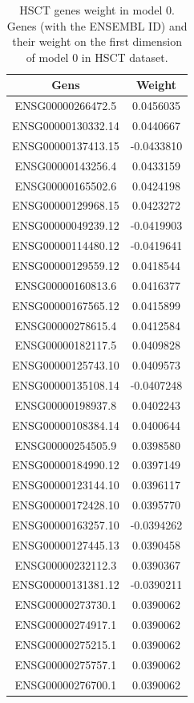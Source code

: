 \documentclass[
  12pt,
  a4paper,
  twoside,
  openright]{book}
\begin{document}
\begin{longtable}[t]{cc}
\caption[HSCT genes weight in model 0]{\label{tab:hsct-genes}HSCT genes weight in model 0. Genes (with the ENSEMBL ID) and their weight on the first dimension of model 0 in HSCT dataset.}\\
\toprule
Gens & Weight\\
\midrule
ENSG00000266472.5 & 0.0456035\\
ENSG00000130332.14 & 0.0440667\\
ENSG00000137413.15 & -0.0433810\\
ENSG00000143256.4 & 0.0433159\\
ENSG00000165502.6 & 0.0424198\\
\addlinespace
ENSG00000129968.15 & 0.0423272\\
ENSG00000049239.12 & -0.0419903\\
ENSG00000114480.12 & -0.0419641\\
ENSG00000129559.12 & 0.0418544\\
ENSG00000160813.6 & 0.0416377\\
\addlinespace
ENSG00000167565.12 & 0.0415899\\
ENSG00000278615.4 & 0.0412584\\
ENSG00000182117.5 & 0.0409828\\
ENSG00000125743.10 & 0.0409573\\
ENSG00000135108.14 & -0.0407248\\
\addlinespace
ENSG00000198937.8 & 0.0402243\\
ENSG00000108384.14 & 0.0400644\\
ENSG00000254505.9 & 0.0398580\\
ENSG00000184990.12 & 0.0397149\\
ENSG00000123144.10 & 0.0396117\\
\addlinespace
ENSG00000172428.10 & 0.0395770\\
ENSG00000163257.10 & -0.0394262\\
ENSG00000127445.13 & 0.0390458\\
ENSG00000232112.3 & 0.0390367\\
ENSG00000131381.12 & -0.0390211\\
\addlinespace
ENSG00000273730.1 & 0.0390062\\
ENSG00000274917.1 & 0.0390062\\
ENSG00000275215.1 & 0.0390062\\
ENSG00000275757.1 & 0.0390062\\
ENSG00000276700.1 & 0.0390062\\
\bottomrule
\end{longtable}
\end{document}
